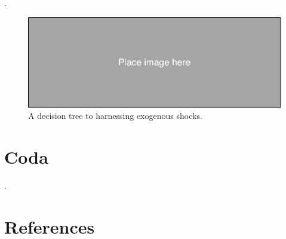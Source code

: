 \begin{refsection}
.



\begin{figure}[!htbp]
  \includegraphics[width=1\textwidth]{exhibits/place_holder.pdf}
  \caption{A decision tree to harnessing exogenous shocks.}
  \label{fig:harnessing_exogeneous_shocks}
\end{figure}

\section{Coda}
\label{sec:coda}
.

\clearpage

%
\section*{References}
\printbibliography[heading=none]
\end{refsection}

%
%
%
%
%
%

